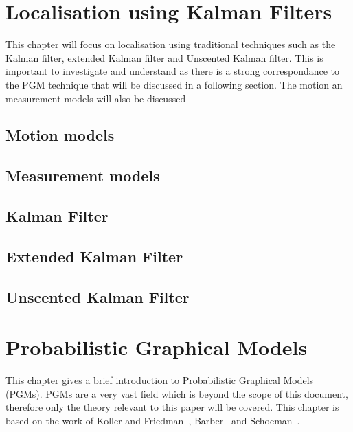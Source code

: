 \documentclass[12pt,oneside,openany,a4paper, %
afrikaans,english,
]{memoir}
\numberwithin{equation}{chapter}
\begin{document}
\chapter{Localisation using Kalman Filters}
This chapter will focus on localisation using traditional techniques such as the Kalman filter, extended Kalman filter and Unscented Kalman filter. This is important to investigate and understand as there is a strong correspondance to the PGM technique that will be discussed in a following section. The motion an measurement models will also be discussed 
\section{Motion models}
\section{Measurement models}
\section{Kalman Filter}
\section{Extended Kalman Filter}
\section{Unscented Kalman Filter}
\chapter{Probabilistic Graphical Models}
This chapter gives a brief introduction to Probabilistic Graphical Models (PGMs). PGMs are a very vast field which is beyond the scope of this document, therefore only the theory relevant to this paper will be covered. This chapter is based on the work of Koller and Friedman~\cite{koller}, Barber~\cite{barber} and Schoeman~\citep{JC}.
\end{document}
